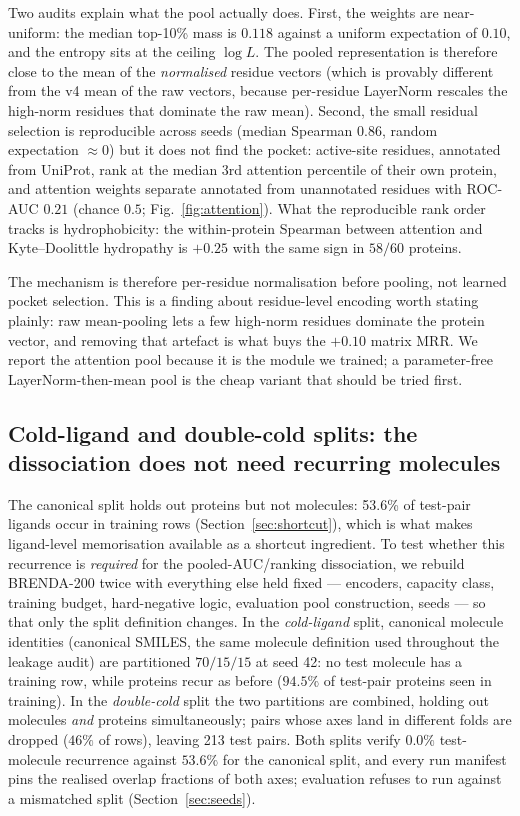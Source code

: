 \documentclass[11pt,a4paper]{article}
\newcommand{\mrr}{matrix MRR}
\begin{document}
Two audits explain what the pool actually does. First, the weights are
near-uniform: the median top-10\% mass is $0.118$ against a uniform
expectation of $0.10$, and the entropy sits at the ceiling $\log L$. The
pooled representation is therefore close to the mean of the
\emph{normalised} residue vectors (which is provably different from the v4
mean of the raw vectors, because per-residue LayerNorm rescales the
high-norm residues that dominate the raw mean). Second, the small residual
selection is reproducible across seeds (median Spearman $0.86$, random
expectation $\approx 0$) but it does not find the pocket: active-site
residues, annotated from UniProt, rank at the median 3rd attention
percentile of their own protein, and attention weights separate annotated
from unannotated residues with ROC-AUC $0.21$ (chance $0.5$; Fig.~\ref{fig:attention}).
What the reproducible rank order tracks is hydrophobicity: the within-protein
Spearman between attention and Kyte--Doolittle hydropathy is $+0.25$ with
the same sign in $58/60$ proteins.

The mechanism is therefore per-residue normalisation before pooling, not
learned pocket selection. This is a finding about residue-level encoding
worth stating plainly: raw mean-pooling lets a few high-norm residues
dominate the protein vector, and removing that artefact is what buys the
$+0.10$ \mrr{}. We report the attention pool because it is the module we
trained; a parameter-free LayerNorm-then-mean pool is the cheap variant that
should be tried first.

\subsection{Cold-ligand and double-cold splits: the dissociation does not need recurring molecules}
\label{sec:cold}

The canonical split holds out proteins but not molecules: 53.6\% of test-pair
ligands occur in training rows (Section~\ref{sec:shortcut}), which is what
makes ligand-level memorisation available as a shortcut ingredient. To test
whether this recurrence is \emph{required} for the pooled-AUC/ranking
dissociation, we rebuild BRENDA-200 twice with everything else held fixed ---
encoders, capacity class, training budget, hard-negative logic, evaluation
pool construction, seeds --- so that only the split definition changes. In
the \emph{cold-ligand} split, canonical molecule identities (canonical
SMILES, the same molecule definition used throughout the leakage audit) are
partitioned $70/15/15$ at seed 42: no test molecule has a training row,
while proteins recur as before ($94.5\%$ of test-pair proteins seen in
training). In the \emph{double-cold} split the two partitions are combined,
holding out molecules \emph{and} proteins simultaneously; pairs whose axes
land in different folds are dropped ($46\%$ of rows), leaving 213 test
pairs. Both splits verify $0.0\%$ test-molecule recurrence against $53.6\%$
for the canonical split, and every run manifest pins the realised overlap
fractions of both axes; evaluation refuses to run against a mismatched
split (Section~\ref{sec:seeds}).
\end{document}
